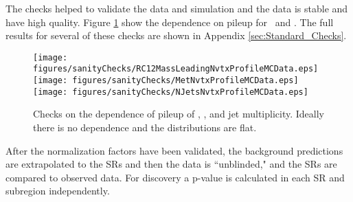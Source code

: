 The checks helped to validate the data and simulation and the data is stable and have high quality.  Figure \ref{fig:nvtxSanityChecks} show the dependence on pileup for \mantikttwelvezero\ and \met. The full results for several of these checks are shown in Appendix \ref{sec:Standard_Checks}. \\

\begin{figure}[tbh]
	\centering
		\texttt{[image: figures/sanityChecks/RC12MassLeadingNvtxProfileMCData.eps]}	
		\texttt{[image: figures/sanityChecks/MetNvtxProfileMCData.eps]}
		\texttt{[image: figures/sanityChecks/NJetsNvtxProfileMCData.eps]}
	\caption[Checks on the dependence of pileup of \mantikttwelvezero, \met, and jet multiplicity.]{\label{fig:nvtxSanityChecks}{Checks on the dependence of pileup of \mantikttwelvezero, \met, and jet multiplicity.  Ideally there is no dependence and the distributions are flat.}}
\end{figure}


After the normalization factors have been validated, the background predictions are extrapolated to the SRs and then the data is ``unblinded," and the SRs are compared to observed data.  For discovery a p-value is calculated in each SR and subregion independently.  \\


